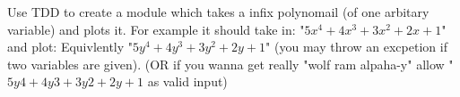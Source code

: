 \begin{problem}
Use TDD to create a module which takes a infix polynomail (of one arbitary variable) and plots it. For example it should take in:
"$5x^4 + 4x^3 + 3x^2+ 2x + 1$" and plot:
Equivlently "$5y^4 + 4y^3 + 3y^2+ 2y + 1$" (you may throw an excpetion if two variables are given).
(OR if you wanna get really "wolf ram alpaha-y" allow "$5y4 + 4y3 + 3y2+ 2y + 1$ as valid input)
\end{problem}


